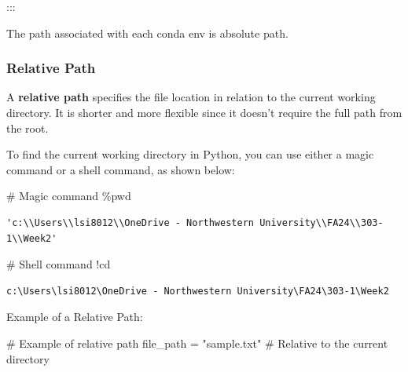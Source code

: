 \documentclass[
  letterpaper,
  DIV=11,
  numbers=noendperiod]{scrreprt}
\newenvironment{Shaded}{\begin{snugshade}}{\end{snugshade}}
\newcommand{\CommentTok}[1]{\textcolor[rgb]{0.37,0.37,0.37}{#1}}
\newcommand{\NormalTok}[1]{\textcolor[rgb]{0.00,0.23,0.31}{#1}}
\newcommand{\OperatorTok}[1]{\textcolor[rgb]{0.37,0.37,0.37}{#1}}
\newcommand{\StringTok}[1]{\textcolor[rgb]{0.13,0.47,0.30}{#1}}
\begin{document}
:::

The path associated with each conda env is absolute path.

\hypertarget{relative-path}{%
\subsubsection{Relative Path}\label{relative-path}}

A \textbf{relative path} specifies the file location in relation to the
current working directory. It is shorter and more flexible since it
doesn't require the full path from the root.

To find the current working directory in Python, you can use either a
magic command or a shell command, as shown below:

\begin{Shaded}
\begin{Highlighting}[]
\CommentTok{\# Magic command}
\OperatorTok{\%}\NormalTok{pwd}
\end{Highlighting}
\end{Shaded}

\begin{verbatim}
'c:\\Users\\lsi8012\\OneDrive - Northwestern University\\FA24\\303-1\\Week2'
\end{verbatim}

\begin{Shaded}
\begin{Highlighting}[]
\CommentTok{\# Shell command}
\OperatorTok{!}\NormalTok{cd}
\end{Highlighting}
\end{Shaded}

\begin{verbatim}
c:\Users\lsi8012\OneDrive - Northwestern University\FA24\303-1\Week2
\end{verbatim}

Example of a Relative Path:

\begin{Shaded}
\begin{Highlighting}[]
\CommentTok{\# Example of relative path}
\NormalTok{file\_path }\OperatorTok{=} \StringTok{"sample.txt"}  \CommentTok{\# Relative to the current directory}
\end{Highlighting}
\end{Shaded}
\end{document}
